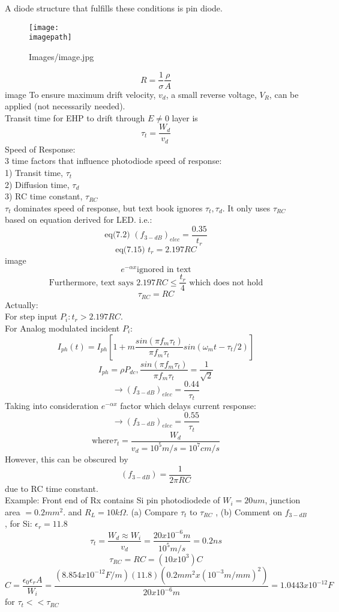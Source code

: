 \documentclass[12pt, onesided]{article}   	%
\newcommand{\imagefolder}{Images}
\newcounter{ImageCounter}
\newcommand{\image}{

\begin{figure}[H]
\centering
\newcommand{\imagepath}{\imagefolder /image\theImageCounter .jpg}
\texttt{[image: \\imagepath]}
\caption{\imagepath}
\end{figure}

\stepcounter{ImageCounter}
}
\begin{document}
A diode structure that fulfills these conditions is pin diode.
\image
\[R=\frac{1}{\sigma}\frac{\rho}{A}\]
image
To ensure maximum drift velocity, $v_d$, a small reverse voltage,  $V_R$, can be applied (not necessarily needed).\\
Transit time for EHP to drift through $E\neq 0$ layer is
\[\tau_t=\frac{W_d}{v_d}\]
\[\]
\[\]
Speed of Response:\\
3 time factors that influence photodiode speed of response:\\
1) Transit time, $\tau_t$\\
2) Diffusion time, $\tau_d$\\
3) RC time constant, $\tau_{RC}$\\
$\tau_t$ dominates speed of response, but text book ignores $\tau_t, \tau_d$. It only uses $\tau_{RC}$ based on equation derived for LED. i.e.:\\
\[\text{eq(7.2) }(f_{3-dB})_{elec}=\frac{0.35}{t_r}\]
\[\text{eq(7.15) }t_r=2.197RC\]
image
\[e^{-\alpha x}\text{ignored in text}\]
\[\text{Furthermore, text says } 2.197RC \leq \frac{t_r}{4}\text{ which does not hold}\]
\[\tau_{RC}=RC\]
Actually:\\
For step input $P_i: t_r > 2.197RC$.\\
For Analog modulated incident $P_i$:\\
\[I_{ph}(t)=I_{ph}[1+m\frac{sin(\pi f_m \tau_t)}{\pi f_m \tau_t}sin(\omega_m t - \tau_t/2)]\]
\[I_{ph} = \rho P_{dc}, \frac{sin(\pi f_m \tau_t)}{\pi f_m \tau_t}= \frac{1}{\sqrt{2}}\]
\[\to (f_{3-dB})_{elec}= \frac{0.44}{\tau_t}\]
Taking into consideration $e^{-\alpha x}$ factor which delays current response:
\[\to (f_{3-dB})_{elec} = \frac{0.55}{\tau_t}\]
\[\text{where} \tau_t = \frac{W_d}{v_d=10^5m/s=10^7cm/s}\]
However, this can be obscured by
\[(f_{3-dB}) = \frac{1}{2\pi RC}\]
due to RC time constant.\\
Example: Front end of Rx contains Si pin photodiodede of $W_i = 20 um$, junction area $=0.2mm^2$. and $R_L = 10 k\Omega$. (a) Compare $\tau_t$ to $\tau_{RC}$ , (b) Comment on $f_{3-dB}$, for Si: $\epsilon_r=11.8$\\
\[\tau_t=\frac{W_d\approx W_i}{v_d}=\frac{20x10^{-6}m}{10^5m/s}=0.2ns\]
\[\tau_{RC}=RC=(10x10^3)C\]
\[C=\frac{\epsilon_0 \epsilon_r A}{W_i}=\frac{(8.854x10^{-12}F/m)(11.8)(0.2mm^2x(10^{-3}m/mm)^2)}{20x10^{-6}m}=1.0443x10^{-12}F\]
 for $\tau_{t} << \tau_{RC}$
\end{document}
